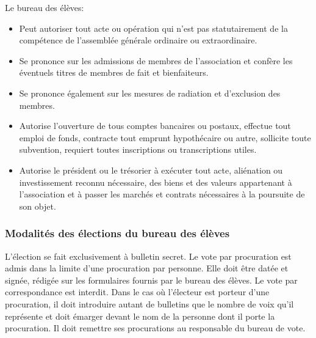 \documentclass{article}
\begin{document}
				Le bureau des élèves:
				\begin{itemize}
					\item Peut autoriser tout acte ou opération qui n’est pas
					    statutairement de la compétence de l’assemblée générale
					    ordinaire ou extraordinaire.
					\item Se prononce sur les admissions de membres de
						l’association et confère les éventuels titres de membres
						de fait et bienfaiteurs.
					\item Se prononce également sur les mesures de radiation et
	    				d’exclusion des membres.
					\item Autorise l’ouverture de tous comptes bancaires ou
						postaux, effectue tout emploi de fonds, contracte tout
						emprunt hypothécaire ou autre, sollicite toute
						subvention, requiert toutes inscriptions ou
						transcriptions utiles.
					\item Autorise le président ou le trésorier à exécuter tout
						acte, aliénation ou investissement reconnu nécessaire,
						des biens et des valeurs appartenant à l’association et
						à passer les marchés et contrats nécessaires à la
						poursuite de son objet.
				\end{itemize}

			\subsubsection{Modalités des élections du bureau des élèves}
\label{ssub:modalites_des_elections_du_bureau_des_eleves}
			
				L’élection se fait exclusivement à bulletin secret. Le vote par
				procuration est admis dans la limite d’une procuration par
				personne. Elle doit être datée et signée, rédigée sur les
				formulaires fournis par le bureau des élèves. Le vote par
				correspondance est interdit. Dans le cas où l’électeur est
				porteur d’une procuration, il doit introduire autant de
				bulletins que le nombre de voix qu’il représente et doit émarger
				devant le nom de la personne dont il porte la procuration. Il
				doit remettre ses procurations au responsable du bureau de vote.
				
\end{document}
